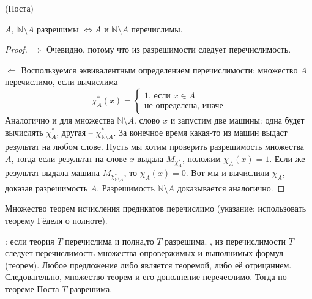 \par \begin{theorem}{(Поста)}
\par$A, \ \mathbb{N}\setminus A$ разрешимы $\iff A$ и $\mathbb{N}\setminus A$ перечислимы.
\begin{proof}
\par$\Longrightarrow$ Очевидно, потому что из разрешимости следует перечислимость.
\par$\Longleftarrow$ Воспользуемся эквивалентным определением перечислимости: множество $A$ перечислимо, если вычислима \begin{equation*}
    \chi^*_{A}(x) = 
    \begin{cases}
    \text{1, если $x \in A$}\\
    \text{не определена, иначе}
    \end{cases}
\end{equation*}
Аналогично и для множества $\mathbb{N}\setminus A$. 
 слово $x$ и запустим две машины: одна будет вычислять $\chi^*_{A}$, другая -- $\chi^*_{\mathbb{N}\setminus A}$. За конечное время какая-то из машин выдаст результат на любом слове. Пусть мы хотим проверить разрешимость множества $A$, тогда если результат на слове $x$ выдала $M_{\chi^*_{A}}$, положим $\chi_{A}(x) = 1$. Если же результат выдала машина $M_{\chi^*_{\mathbb{N}\setminus A}}$, то $\chi_{A}(x) = 0$. Вот мы и вычислили $\chi_{A}$, доказав разрешимость $A$. Разрешимость $\mathbb{N}\setminus A$ доказывается аналогично.
\end{proof}
\end{theorem}

\begin{corollary}
Множество теорем исчисления предикатов перечислимо (указание: использовать теорему Гёделя о полноте).
\end{corollary}
: если теория $T$ перечислима и полна,то $T$ разрешима.
, из перечислимости $T$ следует перечислимость множества опровержимых и выполнимых формул (теорем). Любое предложение либо является теоремой, либо её отрицанием. Следовательно, множество теорем и его дополнение перечеслимо. Тогда по теореме Поста $T$ разрешима.
